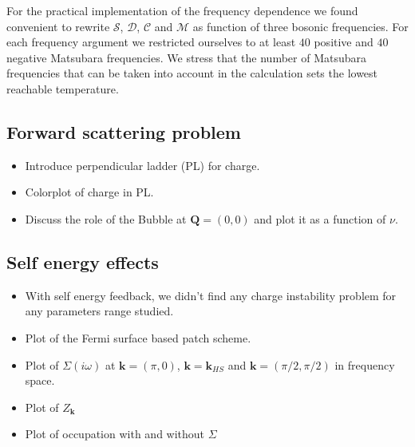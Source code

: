 For the practical implementation of the frequency dependence we found convenient to rewrite $\mathcal{S}$, $\mathcal{D}$, $\mathcal{C}$ and $\mathcal{M}$ as function of three bosonic frequencies. 
For each frequency argument we restricted ourselves to at least $40$ positive and $40$ negative Matsubara frequencies. 
We stress that the number of Matsubara frequencies that can be taken into account in the calculation sets the lowest reachable temperature.
  


\subsection{Forward scattering problem}

\begin{itemize}

\item Introduce perpendicular ladder (PL) for charge.

\item Colorplot of charge in PL.

\item Discuss the role of the Bubble at $\boldsymbol{Q}=(0,0)$ and plot it as a function of $\nu$.

\end{itemize}

\subsection{Self energy effects}

\begin{itemize}

\item With self energy feedback, we didn't find any charge instability problem for any parameters range studied.

\item Plot of the Fermi surface based patch scheme.

\item Plot of $\Sigma(i\omega)$ at $\boldsymbol{k}=(\pi,0)$, $\boldsymbol{k}=\boldsymbol{k}_{HS}$ and $\boldsymbol{k}=(\pi/2,\pi/2)$ in frequency space.

\item Plot of $Z_{\boldsymbol{k}}$

\item Plot of occupation with and without $\Sigma$

\end{itemize}